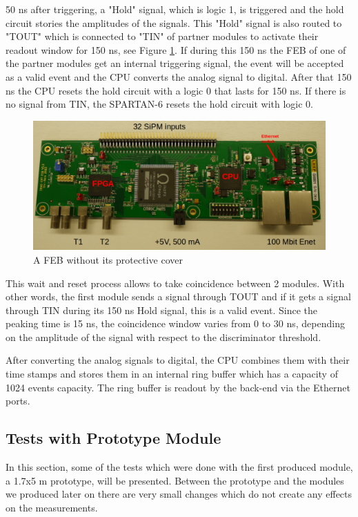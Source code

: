 \documentclass[a4paper]{article}\linespread{1.4}
\begin{document}
50 ns after triggering, a "Hold" signal, which is logic 1, is triggered and the hold circuit stories the amplitudes of the signals. This "Hold" signal is also routed to "TOUT" which is connected to "TIN" of partner modules to activate their readout window for 150 ns, see Figure \ref{fig:tout}. If during this 150 ns the FEB of one of the partner modules get an internal triggering signal, the event will be accepted as a valid event and the CPU converts the analog signal to digital. After that 150 ns the CPU resets the hold circuit with a logic 0 that lasts for 150 ns. If there is no signal from TIN, the SPARTAN-6 resets the hold circuit with logic 0. 
\begin{figure}[h!] \centering \includegraphics[width=120mm,scale=1.0]{tout.png} \caption{ A FEB without its protective cover \cite{E}} \label{fig:tout} \end{figure}

This wait and reset process allows to take coincidence between 2 modules. With other words, the first module sends a signal through TOUT and if it gets a signal through TIN during its 150 ns Hold signal, this is a valid event. %
Since the peaking time is 15 ns, the coincidence window varies from 0 to 30 ns, depending on the amplitude of the signal with respect to the discriminator threshold. %

After converting the analog signals to digital, the CPU combines them with their time stamps and stores them in an internal ring buffer which has a capacity of 1024 events capacity. The ring buffer is readout by the back-end via the Ethernet ports.

\subsection{Tests with Prototype Module}
\label{chap:proto}
In this section, some of the tests which were done with the first produced module, a 1.7x5 m prototype, will be presented. Between the prototype and the modules we produced later on there are very small changes which do not create any effects on the measurements.
\end{document}
